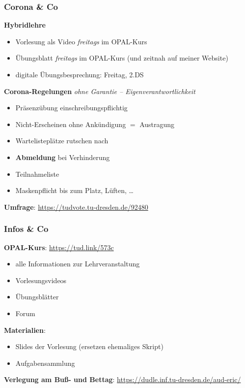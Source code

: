 \documentclass{beamer}
\begin{document}
	\begin{frame} \frametitle{Corona \& Co}
		\textbf{Hybridlehre}
		\begin{itemize}
			\item Vorlesung als Video \textit{freitags} im OPAL-Kurs
			\item Übungsblatt \textit{freitags} im OPAL-Kurs (und zeitnah auf meiner Website)
			\item digitale Übungsbesprechung: Freitag, 2.DS
		\end{itemize}
		
		\textbf{Corona-Regelungen} {\tiny \itshape ohne Garantie -- Eigenverantwortlichkeit}
		\begin{itemize}
			\item Präsenzübung einschreibungspflichtig
			\item Nicht-Erscheinen ohne Ankündigung $=$ Austragung
			\item Wartelisteplätze rutschen nach
			\item \alert{\textbf{Abmeldung} bei Verhinderung}
			\item Teilnahmeliste
			\item Maskenpflicht bis zum Platz, Lüften, \dots
		\end{itemize}
		
		\textbf{Umfrage}: \url{https://tudvote.tu-dresden.de/92480}
	\end{frame}

	\begin{frame}\frametitle{Infos \& Co}		
		\textbf{OPAL-Kurs}: 
		\url{https://tud.link/573c}
		
		\begin{itemize}
			\item alle Informationen zur Lehrveranstaltung
			\item Vorlesungsvideos
			\item Übungsblätter
			\item Forum
		\end{itemize}
		
		\textbf{Materialien}: 
		\begin{itemize}
			\item Slides der Vorlesung (ersetzen ehemaliges Skript)
			\item Aufgabensammlung
		\end{itemize}
	
		\textbf{Verlegung am Buß- und Bettag}: \url{https://dudle.inf.tu-dresden.de/aud-eric/}
	\end{frame}
\end{document}
